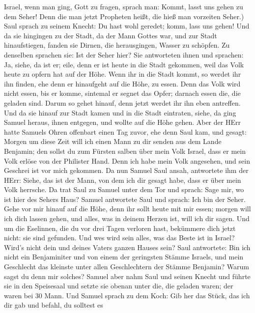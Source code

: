 Israel, wenn man ging, Gott zu fragen, sprach man: Kommt, lasst uns
gehen zu dem Seher! Denn die man jetzt Propheten heißt, die hieß man
vorzeiten Seher.)  Saul sprach zu seinem Knecht: Du hast
wohl geredet; komm, lass uns gehen! Und da sie hingingen zu der Stadt,
da der Mann Gottes war,  und zur Stadt hinaufstiegen,
fanden sie Dirnen, die herausgingen, Wasser zu schöpfen. Zu denselben
sprachen sie: Ist der Seher hier?  Sie antworteten ihnen
und sprachen: Ja, siehe, da ist er; eile, denn er ist heute in die Stadt
gekommen, weil das Volk heute zu opfern hat auf der Höhe. 
Wenn ihr in die Stadt kommt, so werdet ihr ihn finden, ehe denn er
hinaufgeht auf die Höhe, zu essen. Denn das Volk wird nicht essen, bis
er komme, sintemal er segnet das Opfer; darnach essen die, die geladen
sind. Darum so gehet hinauf, denn jetzt werdet ihr ihn eben antreffen.
 Und da sie hinauf zur Stadt kamen und in die Stadt
eintraten, siehe, da ging Samuel heraus, ihnen entgegen, und wollte auf
die Höhe gehen.  Aber der HErr hatte Samuels Ohren
offenbart einen Tag zuvor, ehe denn Saul kam, und gesagt: 
Morgen um diese Zeit will ich einen Mann zu dir senden aus dem Lande
Benjamin; den sollst du zum Fürsten salben über mein Volk Israel, dass
er mein Volk erlöse von der Philister Hand. Denn ich habe mein Volk
angesehen, und sein Geschrei ist vor mich gekommen.  Da nun
Samuel Saul ansah, antwortete ihm der HErr: Siehe, das ist der Mann, von
dem ich dir gesagt habe, dass er über mein Volk herrsche. 
Da trat Saul zu Samuel unter dem Tor und sprach: Sage mir, wo ist hier
des Sehers Haus?  Samuel antwortete Saul und sprach: Ich
bin der Seher. Gehe vor mir hinauf auf die Höhe, denn ihr sollt heute
mit mir essen; morgen will ich dich lassen gehen, und alles, was in
deinem Herzen ist, will ich dir sagen.  Und um die
Eselinnen, die du vor drei Tagen verloren hast, bekümmere dich jetzt
nicht: sie sind gefunden. Und wes wird sein alles, was das Beste ist in
Israel? Wird's nicht dein und deines Vaters ganzen Hauses sein?
 Saul antwortete: Bin ich nicht ein Benjaminiter und von
einem der geringsten Stämme Israels, und mein Geschlecht das kleinste
unter allen Geschlechtern der Stämme Benjamin? Warum sagst du denn mir
solches?  Samuel aber nahm Saul und seinen Knecht und
führte sie in den Speisesaal und setzte sie obenan unter die, die
geladen waren; der waren bei 30 Mann.  Und Samuel sprach zu
dem Koch: Gib her das Stück, das ich dir gab und befahl, du solltest es
